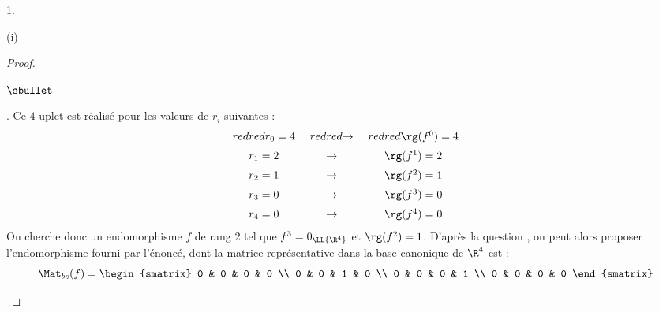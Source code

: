 \documentclass[11pt]{article}%
\begin{document}
\begin{noliste}{1.}
\begin{noliste}{(i)}
\begin{proof}
\begin{noliste}{$\sbullet$}
          \newpage


        \item {}. Ce
          $4$-uplet est réalisé pour les valeurs de $r_i$ suivantes :
          \[
          \begin{array}{c@{\ \quad}c@{\ \quad}c}
            \color{red}{r_0 = 4} & \color{red}{\rightarrow} &
            \color{red}{\rg(f^0) = 4} \\[.2cm] 
            r_1 = 2 & \rightarrow & \rg(f^1) = 2 \\[.2cm]
            r_2 = 1 & \rightarrow & \rg(f^2) = 1 \\[.2cm]
            r_3 = 0 & \rightarrow & \rg(f^3) = 0 \\[.2cm]
            r_4 = 0 & \rightarrow & \rg(f^4) = 0 
          \end{array}
          \]
          On cherche donc un endomorphisme $f$ de rang $2$ tel que
          $f^3 = 0_{\LL{\R^4}}$ et $\rg(f^2) = 1$. D'après la question
          , on peut alors proposer l'endomorphisme fourni par
          l'énoncé, dont la matrice représentative dans la base
          canonique de $\R^4$ est :
          \[
          \Mat_{bc}(f) =
          \begin{smatrix}
            0 & 0 & 0 & 0 \\
            0 & 0 & 1 & 0 \\
            0 & 0 & 0 & 1 \\
            0 & 0 & 0 & 0 
          \end{smatrix}
          \]


\end{noliste}
\end{proof}
\end{noliste}
\end{noliste}
\end{document}

